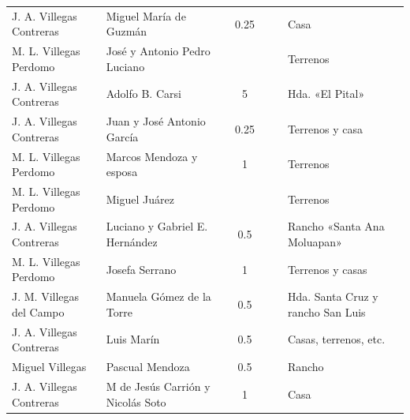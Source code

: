 \documentclass[14pt,twoside,final]{extbook} %
\begin{document}
{\begin{longtable}[c]{@{}p{2.5cm}lrSrrl@{}}
J. A. Villegas Contreras & Miguel María de Guzmán &  & 0.25 &  &  & Casa \\
M. L. Villegas Perdomo & José y Antonio Pedro Luciano &  & {} & {} & {} & Terrenos \\
J. A. Villegas Contreras & Adolfo B. Carsi &  & 5 &  &  & Hda. «El Pital» \\
J. A. Villegas Contreras & Juan y José Antonio García &  & 0.25 &  &  & Terrenos y casa \\
M. L. Villegas Perdomo & Marcos Mendoza y esposa &  & 1 & {} & {} & Terrenos \\
M. L. Villegas Perdomo & Miguel Juárez &  & {} & {} & {} & Terrenos \\
J. A. Villegas Contreras & Luciano y Gabriel E. Hernández &  & 0.5 &  &  & Rancho «Santa Ana Moluapan» \\
M. L. Villegas Perdomo & Josefa Serrano &  & 1 & {} & {} & Terrenos y casas \\
J. M. Villegas del Campo & Manuela Gómez de la Torre &  & 0.5 &  &  & Hda. Santa Cruz y rancho San Luis \\
J. A. Villegas Contreras & Luis Marín &  & 0.5 &  &  & Casas, terrenos, etc. \\
Miguel Villegas & Pascual Mendoza &  & 0.5 & {} & {} & Rancho \\
J. A. Villegas Contreras & M de Jesús Carrión y Nicolás Soto &  & 1 & {} & {} & Casa \\

\end{longtable}}
\end{document}
